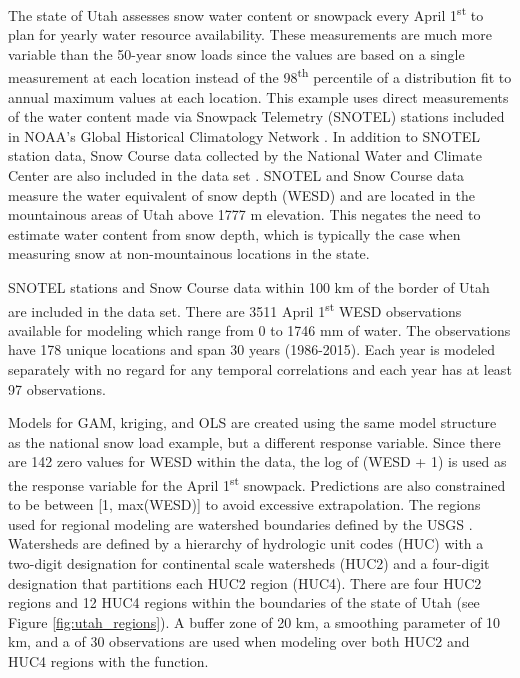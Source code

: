 The state of Utah assesses snow water content or snowpack every April 1\textsuperscript{st} to plan for yearly water resource availability. These measurements are much more variable than the 50-year snow loads since the values are based on a single measurement at each location instead of the 98\textsuperscript{th} percentile of a distribution fit to annual maximum values at each location. This example uses direct measurements of the water content made via Snowpack Telemetry (SNOTEL) stations included in NOAA's Global Historical Climatology Network \citep{menne2012}. In addition to SNOTEL station data, Snow Course data collected by the National Water and Climate Center are also included in the data set \citep{NRCS2017}. SNOTEL and Snow Course data measure the water equivalent of snow depth (WESD) and are located in the mountainous areas of Utah above 1777 m elevation. This negates the need to estimate water content from snow depth, which is typically the case when measuring snow at non-mountainous locations in the state.

SNOTEL stations and Snow Course data within 100 km of the border of Utah are included in the data set. There are 3511 April 1\textsuperscript{st} WESD observations available for modeling which range from 0 to 1746 mm of water. The observations have 178 unique locations and span 30 years (1986-2015). Each year is modeled separately with no regard for any temporal correlations and each year has at least 97 observations.

Models for GAM, kriging, and OLS are created using the same model structure as the national snow load example, but a different response variable. Since there are 142 zero values for WESD within the data, the log of (WESD + 1) is used as the response variable for the April 1\textsuperscript{st} snowpack. Predictions are also constrained to be between [1, max(WESD)] to avoid excessive extrapolation. The regions used for regional modeling are watershed boundaries defined by the USGS \citep{USGS2020_2}. Watersheds are defined by a hierarchy of hydrologic unit codes (HUC) with a two-digit designation for continental scale watersheds (HUC2) and a four-digit designation that partitions each HUC2 region (HUC4). There are four HUC2 regions and 12 HUC4 regions within the boundaries of the state of Utah (see Figure \ref{fig:utah_regions}). A buffer zone of 20 km, a smoothing parameter of 10 km, and a  of 30 observations are used when modeling over both HUC2 and HUC4 regions with the  function.

